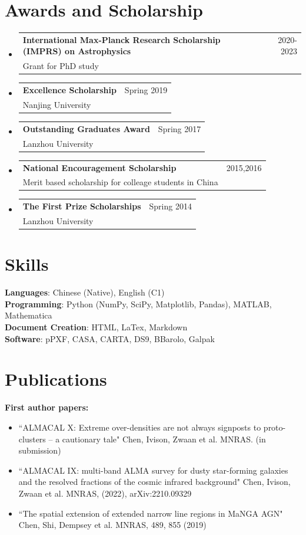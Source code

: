 \documentclass[A4,11pt]{article}
\makeatletter
\newcommand{\CVSubheading}[4]{
  \vspace{-2pt}\item
    \begin{tabular*}{0.97\textwidth}[t]{l@{\extracolsep{\fill}}r}
      \textbf{#1} & #2 \\
      \small#3 & \small #4 \\
    \end{tabular*}\vspace{-7pt}
}
\newcommand{\CVSubHeadingListStart}{\begin{itemize}[leftmargin=0.5cm, label={}]}
\newcommand{\CVSubHeadingListEnd}{\end{itemize}}
\newenvironment{paperlist}
{ \begin{itemize}[leftmargin=0.8cm, label={$\bullet$}]
    \setlength{\itemsep}{1pt}
    \setlength{\parskip}{1pt}
    \setlength{\parsep}{1pt}     }
{ \end{itemize}                  }
\makeatother
\begin{document}
\section{Awards and Scholarship}
  \CVSubHeadingListStart
    \CVSubheading
      {International Max-Planck Research Scholarship (IMPRS) on Astrophysics}{2020-2023}
      {Grant for PhD study}{}
    \CVSubheading
      {Excellence Scholarship}{Spring 2019}
      {Nanjing University}{}
    \CVSubheading
      {Outstanding Graduates Award}{Spring 2017}
      {Lanzhou University}{}
    \CVSubheading
      {National Encouragement Scholarship}{2015,2016}
      {Merit based scholarship for colleage students in China}{}
    \CVSubheading
      {The First Prize Scholarships}{Spring 2014}
      {Lanzhou University}{}
  \CVSubHeadingListEnd

\section{Skills}
 \begin{itemize}[leftmargin=0.5cm, label={}]
    \small{\item{
     \textbf{Languages}{: Chinese (Native), English (C1)} \\
     \textbf{Programming}{: Python (NumPy, SciPy, Matplotlib, Pandas), MATLAB, Mathematica} \\
     \textbf{Document Creation}{: HTML, LaTex, Markdown} \\
     \textbf{Software}{: pPXF, CASA, CARTA, DS9, BBarolo, Galpak}
    }}
 \end{itemize}


\section{Publications}
{\bf First author papers:}\\
\vspace{-0.8em}
\begin{paperlist}
    \item ``ALMACAL X: Extreme over-densities are not always signposts to proto-clusters -- a cautionary tale" Chen, Ivison, Zwaan et al. MNRAS. (in submission)
    \item ``ALMACAL IX: multi-band ALMA survey for dusty star-forming galaxies and the resolved fractions of the cosmic infrared background" Chen, Ivison, Zwaan et al. MNRAS, (2022), arXiv:2210.09329 
    \item ``The spatial extension of extended narrow line regions in MaNGA AGN" Chen, Shi, Dempsey et al. MNRAS, 489, 855 (2019)
\end{paperlist}
\end{document}
